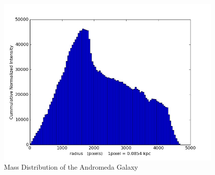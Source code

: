 \documentclass{article}
\begin{document}
\begin{enumerate}
\begin{verbatim}
\end{verbatim}
\begin{figure} [h]
\centering
\includegraphics[scale=0.5]{histogram.jpg}
\caption{Mass Distribution of the Andromeda Galaxy }
\end{figure}


\end{enumerate}


  
\end{document}
